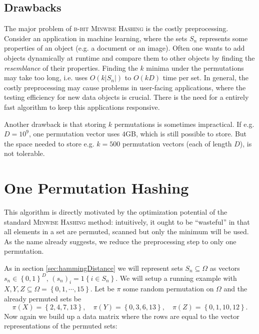 \documentclass[a4paper]{article}
\begin{document}
\subsection{Drawbacks} \label{sec:b-bitDrawbacks}

The major problem of \textsc{b-bit Minwise Hashing} is the costly preprocessing. Consider an application in machine learning, where the sets $S_n$ represents some properties of an object (e.g. a document or an image). Often one wants to add objects dynamically at runtime and compare them to other objects by finding the \emph{resemblance} of their properties. Finding the $k$ minima under the permutations may take too long, i.e. uses $O(k|S_n|)$ to $O(kD)$ time per set.
In general, the costly preprocessing may cause problems in user-facing applications, where the testing efficiency for new data objects is crucial. There is the need for a entirely fast algorithm to keep this applications responsive.

Another drawback is that storing $k$ permutations is sometimes impractical. If e.g. $D=10^9$, one permutation vector uses $4$GB, which is still possible to store. But the space needed to store e.g. $k=500$ permutation vectors (each of length $D$), is not tolerable.



\section{One Permutation Hashing}

This algorithm is directly motivated by the optimization potential of the standard \textsc{Minwise Hashing} method: intuitively, it ought to be ``wasteful'' in that all elements in a set are permuted, scanned but only the minimum will be used. As the name already suggests, we reduce the preprocessing step to only one permutation.

As in section \vref{sec:hammingDistance} we will represent sets $S_n \subseteq \Omega$ as vectors $s_n \in \left\lbrace 0,1 \right\rbrace ^D, \, (s_n)_i = 1\left\lbrace i \in S_n \right\rbrace$. We will setup a running example with $X,Y,Z \subseteq \Omega = \left\lbrace 0,1,\cdots,15\right\rbrace$. Let be $\pi$ some random permutation on $\Omega$ and the already permuted sets be
\[
\pi(X)=\left\lbrace 2,4,7,13\right\rbrace, \quad \pi(Y)=\left\lbrace 0,3,6,13\right\rbrace,\quad \pi(Z)= \left\lbrace 0,1,10,12\right\rbrace.
\]
Now again we build up a data matrix where the rows are equal to the vector representations of the permuted sets:
\end{document}
